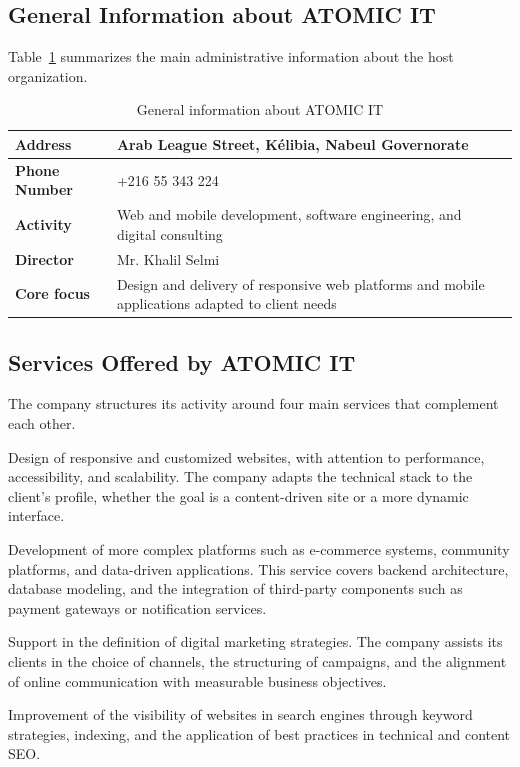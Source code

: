 \subsection{General Information about ATOMIC IT}

Table~\ref{tab:atomic_info} summarizes the main administrative information about the host organization.

\begin{table}[H]
\centering
\caption{General information about ATOMIC IT}
\label{tab:atomic_info}
\begin{tabular}{|l|p{9cm}|}
\hline
\textbf{Address}      & Arab League Street, Kélibia, Nabeul Governorate \\
\hline
\textbf{Phone Number} & +216 55 343 224 \\
\hline
\textbf{Activity}     & Web and mobile development, software engineering, and digital consulting \\
\hline
\textbf{Director}     & Mr. Khalil Selmi \\
\hline
\textbf{Core focus}   & Design and delivery of responsive web platforms and mobile applications adapted to client needs \\
\hline
\end{tabular}
\end{table}

\subsection{Services Offered by ATOMIC IT}

The company structures its activity around four main services that complement each other.

\begin{description}[noitemsep]
    \item[Website Creation.] Design of responsive and customized websites, with attention to performance, accessibility, and scalability. The company adapts the technical stack to the client's profile, whether the goal is a content-driven site or a more dynamic interface.
    \item[Web Engineering.] Development of more complex platforms such as e-commerce systems, community platforms, and data-driven applications. This service covers backend architecture, database modeling, and the integration of third-party components such as payment gateways or notification services.
    \item[Web Marketing.] Support in the definition of digital marketing strategies. The company assists its clients in the choice of channels, the structuring of campaigns, and the alignment of online communication with measurable business objectives.
    \item[Search Engine Optimization.] Improvement of the visibility of websites in search engines through keyword strategies, indexing, and the application of best practices in technical and content SEO.
\end{description}

